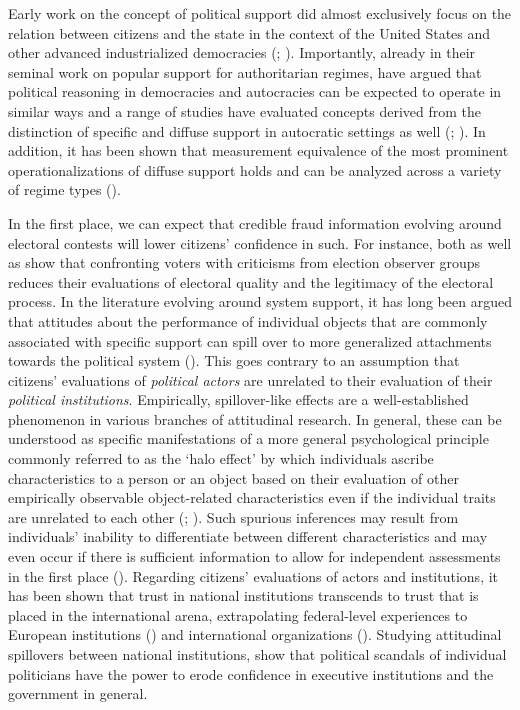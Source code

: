 \documentclass[11pt, ngerman,english,a4]{article}
\begin{document}
Early work on the concept of political support did almost exclusively focus on the relation between citizens and the state in the context of the United States and other advanced industrialized democracies (\citealt{Easton1965, Easton1975}; \citealt{Citrin1974}). Importantly, already in their seminal work on popular support for authoritarian regimes, \citet{Geddes1989} have argued that political reasoning in democracies and autocracies can be expected to operate in similar ways and a range of studies have evaluated concepts derived from the distinction of specific and diffuse support in autocratic settings as well (\citealt{Reuter2019}; \citealt{Frye2019}). In addition, it has been shown that measurement equivalence of the most prominent operationalizations of diffuse support holds and can be analyzed across a variety of regime types (\citealt{Schneider2017}). 

In the first place, we can expect that credible fraud information evolving around electoral contests will lower citizens' confidence in such. For instance, both \citet{Robertson2017} as well as \citet{Bush2018} show that confronting voters with criticisms from election observer groups reduces their evaluations of electoral quality and the legitimacy of the electoral process. In the literature evolving around system support, it has long been argued that attitudes about the performance of individual objects that are commonly associated with specific support can spill over to more generalized attachments towards the political system (\citealt{Bowler2004}). This goes contrary to an assumption that citizens' evaluations of \textit{political actors} are unrelated to their evaluation of their \textit{political institutions}. Empirically, spillover-like effects are a well-established phenomenon in various branches of attitudinal research. In general, these can be understood as specific manifestations of a more general psychological principle commonly referred to as the `halo effect' by which individuals ascribe characteristics to a person or an object based on their evaluation of other empirically observable object-related characteristics even if the individual traits are unrelated to each other (\citealt{Thorndike1920}; \citealt{Palmer2016}). Such spurious inferences may result from individuals' inability to differentiate between different characteristics and may even occur if there is sufficient information to allow for independent assessments in the first place (\citealt{Nisbett1977}). Regarding citizens' evaluations of actors and institutions, it has been shown that trust in national institutions transcends to trust that is placed in the international arena, extrapolating federal-level experiences to European institutions (\citealt{Torcal2019}) and international organizations (\citealt{Dellmuth2015}). Studying attitudinal spillovers between national institutions, \citet{Bowler2004} show that political scandals of individual politicians have the power to erode confidence in executive institutions and the government in general. 
\end{document}
